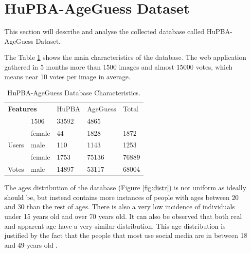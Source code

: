 \section{HuPBA-AgeGuess Dataset}

This section will describe and analyse the collected database called HuPBA-AgeGuess Dataset.  

The Table \ref{tab:charact} shows the main characteristics of the database. The web application gathered in 5 months more than 1500 images and almost 15000 votes, which means near 10 votes per image in average.  

\begin{table}[h]
	\centering
	\begin{tabular}{|c|l||l|l|l|}
		\hline
		\multicolumn{2}{|l||}{\textbf{Features}} & HuPBA & AgeGuess & Total \\ \hhline{==#===}
		\multicolumn{2}{|l||}{Images}                                    & 1506  & 33592 & 4865\\ \hline
		& female                & 44  & 1828 & 1872  \\ \cline{2-3} 
		\multirow{-2}{*}{Users}                 & male                  & 110 & 1143 & 1253 \\ \hline
		& female                & 1753  & 75136 & 76889\\ \cline{2-3} 
		\multirow{-2}{*}{Votes}                 & male                  & 14897 & 53117 & 68004\\ \hline
	\end{tabular}
	\caption{HuPBA-AgeGuess Database Characteristics.}
	\label{tab:charact}
\end{table}
	
The ages distribution of the database (Figure \ref{fig:distr}) is not uniform as ideally should be, but instead contains more instances of people with ages between 20 and 30 than the rest of ages. There is also a very low incidence of individuals under 15 years old and over 70 years old. It can also be observed that both real and apparent age have a very similar distribution. This age distribution is justified by the fact that the people that most use social media are in between 18 and 49 years old \cite{brenner201372}.

